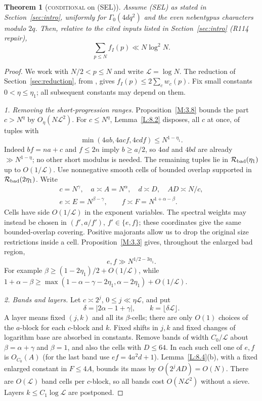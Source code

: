 \documentclass[10pt,reqno]{amsart}
\newtheorem{theorem}{Theorem}[section]
\theoremstyle{definition}
\numberwithin{equation}{section}
\newcommand{\cL}{\mathcal L}
\newcommand{\status}[1]{\textup{\textsc{#1}}}
\begin{document}
\begin{theorem}[\status{conditional} on (SEL)]\label{L:8.1}
Assume \textup{(SEL)} as stated in Section~\ref{sec:intro}, uniformly for
$\Gamma_0(4dq^2)$ and the even nebentypus characters modulo $2q$.
Then, relative to the cited inputs listed in Section~\ref{sec:intro}
(R114 repair),
\[
 \sum_{p\leq N}f_I(p)\ll N\log^2N.
\]
\end{theorem}
\begin{proof}
We work with $N/2<p\leq N$ and write $\cL=\log N$.
The reduction of Section~\ref{sec:reduction}, from
\cite[Proposition~2.2 and Lemma~2.8]{ET}, gives
$f_I(p)\leq2\sum_cw_c(p)$.  Fix small constants
$0<\eta\leq\eta_1$; all subsequent constants may depend on them.

\smallskip\noindent
\emph{1. Removing the short-progression ranges.}
Proposition~\ref{M:3.8} bounds the part $c>N^\eta$ by $O_\eta(N\cL^2)$.
For $c\leq N^\eta$, Lemma~\ref{L:8.2}
disposes, all $c$ at once, of tuples with
\[
 \min(4ab,4acf,4cdf)\leq N^{1-\eta_1}.
\]
Indeed $bf=na+c$ and $f\leq2n$ imply $b\geq a/2$, so $4ad$ and
$4bd$ are already $\gg N^{1-\eta}$; no other short modulus is needed.
The remaining tuples lie in $\mathcal R_{\rm bad}(\eta_1)$ up to
$O(1/\cL)$. Use nonnegative smooth cells of bounded overlap supported in
$\mathcal R_{\rm bad}(2\eta_1)$.  Write
\begin{equation}\label{C:eq:cell-scales}
 \begin{gathered}
 c=N^\gamma,\quad a\asymp A=N^\alpha,\quad d\asymp D,\quad AD\asymp N/c,\\
 e\asymp E=N^{\beta-\gamma},\qquad f\asymp F=N^{1+\alpha-\beta}.
 \end{gathered}
\end{equation}
Cells have side $O(1/\cL)$ in the exponent variables.  The spectral
weights may instead be chosen in $(f',a/f')$, $f'\in\{e,f\}$;
these coordinates give the same bounded-overlap covering.  Positive
majorants allow us to drop the original size restrictions inside a cell.
Proposition~\ref{M:3.3} gives, throughout the enlarged bad region,
\begin{equation}\label{C:eq:large-divisors}
 e,f\gg N^{1/2-3\eta_1}.
\end{equation}
For example $\beta\geq(1-2\eta_1)/2+O(1/\cL)$, while
$1+\alpha-\beta\geq
\max(1-\alpha-\gamma-2\eta_1,\alpha-2\eta_1)+O(1/\cL)$.

\smallskip\noindent
\emph{2. Bands and layers.}
Let $c\asymp2^j$, $0\leq j\ll\eta\cL$, and put
\[
 \delta=|2\alpha-1+\gamma|,\qquad k=\lfloor\delta\cL\rfloor.
\]
A layer means fixed $(j,k)$ and all its $\beta$-cells; there are only
$O(1)$ choices of the $a$-block for each $c$-block and $k$.
Fixed shifts in $j,k$ and fixed changes of logarithm base are absorbed
in constants.  Remove bands of width $C_0/\cL$ about
$\beta=\alpha+\gamma$ and $\beta=1$, and also the cells with $D\leq64$.
In each such cell one of $e,f$ is $O_{C_0}(A)$ (for the last band use
$ef=4a^2d+1$).  Lemma~\ref{L:8.4}(b), with a fixed enlarged constant
in $F\leq4A$, bounds its mass by $O(2^jAD)=O(N)$.
There are $O(\cL)$ band cells per $c$-block, so all bands cost
$O(N\cL^2)$ without a sieve.  Layers $k\leq C_1\log\cL$ are postponed.


\end{proof}
\end{document}
